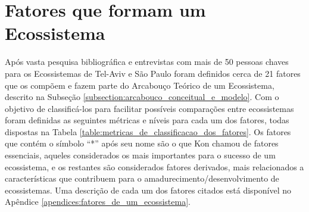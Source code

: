 \section{Fatores que formam um Ecossistema}
\label{subsection:fatores_que_formam_um_ecossistema}

Após vasta pesquisa bibliográfica e entrevistas com mais de 50 pessoas chaves para os Ecossistemas de Tel-Aviv e São Paulo foram definidos cerca de 21 fatores que os compõem e fazem parte do Arcabouço Teórico de um Ecossistema, descrito na Subseção \ref{subsection:arcabouco_conceitual_e_modelo}. Com o objetivo de classificá-los para facilitar possíveis comparações entre ecossistemas foram definidas as seguintes métricas e níveis para cada um dos fatores, todas dispostas na Tabela \ref{table:metricas_de_classificacao_dos_fatores}. Os fatores que contém o símbolo ``*''  após seu nome são o que Kon chamou de fatores essenciais, aqueles considerados os mais importantes para o sucesso de um ecossistema, e os restantes são considerados fatores derivados, mais relacionados a características que contribuem para o amadurecimento/desenvolvimento de ecossistemas. Uma descrição de cada um dos fatores citados está disponível no Apêndice \ref{apendices:fatores_de_um_ecossistema}.

